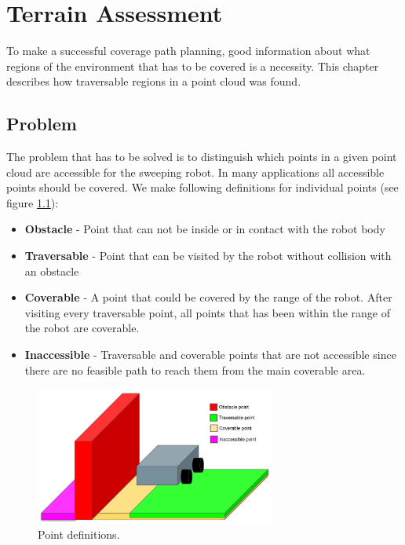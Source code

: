 


\chapter{Terrain Assessment}
\label{cha:terain_assessment}
To make a successful coverage path planning, good information about what regions of the environment that has to be covered is a necessity. This chapter describes how traversable regions in a point cloud was found.

\section{Problem}
The problem that has to be solved is to distinguish which points in a given point cloud are accessible for the sweeping robot. In many applications all accessible points should be covered. We make following definitions for individual points (see figure \ref{fig:pointdefinitions}):
\begin{itemize}
    \item \textbf{Obstacle} - Point that can not be inside or in contact with the robot body  
    \item \textbf{Traversable} - Point that can be visited by the robot without collision with an obstacle
    \item \textbf{Coverable} - A point that could be covered by the range of the robot. After visiting every traversable point, all points that has been within the range of the robot are coverable.
    \item \textbf{Inaccessible} - Traversable and coverable points that are not accessible since there are no feasible path to reach them from the main coverable area. 
\end{itemize}

\begin{figure}
    \centering
    \includegraphics[width=0.7\textwidth]{figures/pointdefinitions.png}
    \caption{Point definitions.}
    \label{fig:pointdefinitions}
\end{figure}

